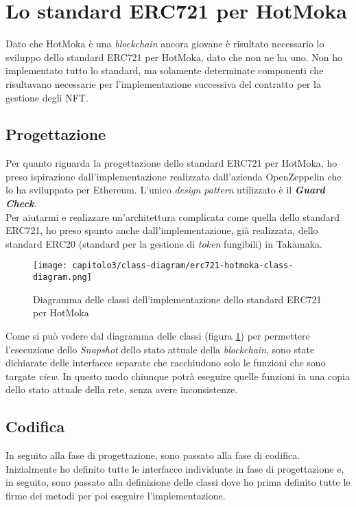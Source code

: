 
\section{Lo standard ERC721 per HotMoka}
Dato che HotMoka è una \textit{blockchain} ancora giovane è risultato necessario lo sviluppo dello standard ERC721 per HotMoka, dato che non ne ha uno. Non ho implementato tutto lo standard, ma solamente determinate componenti che risultavano necessarie per l'implementazione successiva del contratto per la gestione degli NFT.

\subsection{Progettazione}
Per quanto riguarda la progettazione dello standard ERC721 per HotMoka, ho preso ispirazione dall'implementazione realizzata dall'azienda OpenZeppelin che lo ha sviluppato per Ethereum. L'unico \textit{design pattern} utilizzato è il \textbf{\textit{Guard Check}}. \\

Per aiutarmi e realizzare un'architettura complicata come quella dello standard ERC721, ho preso spunto anche dall'implementazione, già realizzata, dello standard ERC20 (standard per la gestione di \textit{token} fungibili) in Takamaka.

\begin{figure}[h!]
  \centering
  \texttt{[image: capitolo3/class-diagram/erc721-hotmoka-class-diagram.png]}
  \caption{Diagramma delle classi dell'implementazione dello standard ERC721 per HotMoka}
  \label{fig:erc721-hotmoka-class-diagram}
\end{figure}

Come si può vedere dal diagramma delle classi (figura \ref{fig:erc721-hotmoka-class-diagram}) per permettere l'esecuzione dello \textit{Snapshot} dello stato attuale della \textit{blockchain}, sono state dichiarate delle interfacce separate che racchiudono solo le funzioni che sono targate \textit{view}. In questo modo chiunque potrà eseguire quelle funzioni in una copia dello stato attuale della rete, senza avere inconsistenze.

\subsection{Codifica}
In seguito alla fase di progettazione, sono passato alla fase di codifica.
Inizialmente ho definito tutte le interfacce individuate in fase di progettazione e, in seguito, sono passato alla definizione delle classi dove ho prima definito tutte le firme dei metodi per poi eseguire l'implementazione. \\

